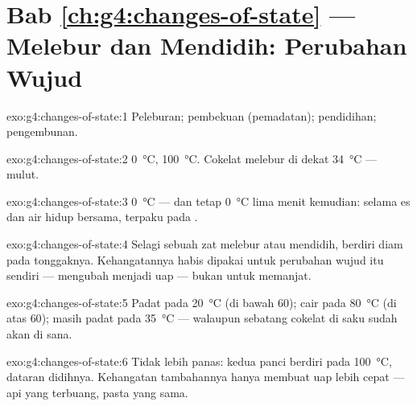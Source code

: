 \section*{Bab \ref{ch:g4:changes-of-state} --- Melebur dan Mendidih: Perubahan Wujud}

\begin{solution}{exo:g4:changes-of-state:1}
Peleburan; pembekuan (pemadatan); pendidihan; pengembunan.
\end{solution}

\begin{solution}{exo:g4:changes-of-state:2}
 \qty{0}{\celsius},  \qty{100}{\celsius}.
Cokelat melebur di dekat \qty{34}{\celsius} ---  mulut.
\end{solution}

\begin{solution}{exo:g4:changes-of-state:3}
\qty{0}{\celsius} --- dan tetap \qty{0}{\celsius} lima menit kemudian:
selama es dan air hidup bersama,  terpaku pada .
\end{solution}

\begin{solution}{exo:g4:changes-of-state:4}
Selagi sebuah zat melebur atau mendidih,  berdiri diam pada
tonggaknya. Kehangatannya habis dipakai untuk perubahan wujud itu
sendiri --- mengubah  menjadi uap --- bukan untuk memanjat.
\end{solution}

\begin{solution}{exo:g4:changes-of-state:5}
Padat pada \qty{20}{\celsius} (di bawah $60$); cair pada
\qty{80}{\celsius} (di atas $60$); masih padat pada
\qty{35}{\celsius} --- walaupun sebatang cokelat di saku sudah akan
 di sana.
\end{solution}

\begin{solution}{exo:g4:changes-of-state:6}
Tidak lebih panas: kedua panci berdiri pada \qty{100}{\celsius},
dataran didihnya. Kehangatan tambahannya hanya membuat uap lebih
cepat --- api yang terbuang, pasta yang sama.
\end{solution}

